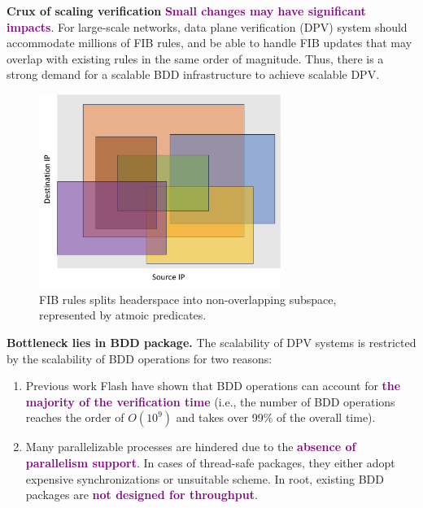 \documentclass[final]{beamer}
\newcommand{\efsz}[1]{\textcolor{purple}{\textbf{#1}}}
\newlength{\colwidthB}
\begin{document}
\begin{frame}[t]
\begin{columns}
\begin{column}[T]{\colwidthB}
\begin{block}{\Large{\textbf{Crux of scaling verification}}}
    \efsz{Small changes may have significant impacts}. For large-scale
    networks, data plane verification (DPV) system should accommodate
    millions of FIB rules, and be able to handle FIB updates that may overlap with existing rules
    in the same order of magnitude. Thus, there is a strong demand for a scalable BDD infrastructure 
    to achieve scalable DPV.

    \vspace{1cm}
      \begin{figure}
      \centering
      \includegraphics[width=0.7\textwidth]{figures/headerspace-split.pdf}
      \caption{FIB rules splits headerspace into non-overlapping subspace, represented by atmoic predicates.}
      \end{figure}
    \vspace{-1cm}

    \end{block}
  \begin{block}{\Large{\textbf{Bottleneck lies in BDD package.}}}
  \large
  The scalability of DPV systems is restricted by the scalability of BDD operations for two reasons: 

  \begin{enumerate}
    \item Previous work Flash have shown that BDD operations can account for 
    \efsz{the majority of the verification time}
    (i.e., the number of BDD operations reaches the order of $O(10^9)$ and 
    takes over 99\% of the overall time).

    \item Many parallelizable processes are hindered due to the \efsz{absence of parallelism support}.
    In cases of thread-safe packages, they either adopt expensive synchronizations or unsuitable
    scheme. In root, existing BDD packages are \efsz{not designed for throughput}.
  \end{enumerate}


\end{block}
\end{column}
\end{columns}
\end{frame}
\end{document}
